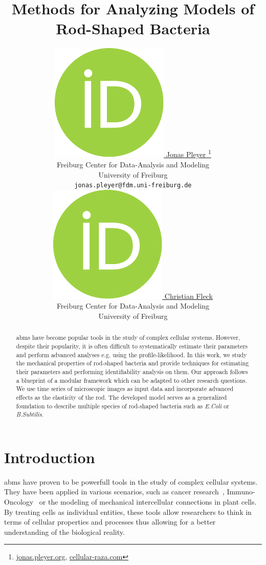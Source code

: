 \documentclass{article}
\title{Methods for Analyzing Models of\\ Rod-Shaped Bacteria}
\author{
    \href{https://orcid.org/0009-0001-0613-7978}{
        \includegraphics[scale=0.06]{figures/orcid.pdf}
        \hspace{1mm}Jonas Pleyer
    }
    \thanks{
        \href{https://jonas.pleyer.org}{jonas.pleyer.org},
        \href{https://cellular-raza.com}{cellular-raza.com}
    }\\
	Freiburg Center for Data-Analysis and Modeling\\
	University of Freiburg\\
	\texttt{jonas.pleyer@fdm.uni-freiburg.de} \\
	\And
	\href{https://orcid.org/0000-0002-6371-4495}{
        \includegraphics[scale=0.06]{figures/orcid.pdf}
        \hspace{1mm}Christian Fleck
    }\\
	Freiburg Center for Data-Analysis and Modeling\\
	University of Freiburg
}
\begin{document}
\maketitle


\begin{abstract}
    \aclp{abm} have become popular tools in the study of complex cellular systems.
    However, despite their popularity, it is often difficult to systematically estimate their
    parameters and perform advanced analyses e.g. using the profile-likelihood.
    In this work, we study the mechanical properties of rod-shaped bacteria and provide techniques
    for estimating their parameters and performing identifiability analysis on them.
    Our approach follows a blueprint of a modular framework which can be adapted to other research
    questions.
    We use time series of microscopic images as input data and incorporate advanced effects as the
    elasticity of the rod.
    The developed model serves as a generalized foundation to describe multiple species of
    rod-shaped bacteria such as \textit{E.Coli} or \textit{B.Subtilis}.
\end{abstract}


\pagebreak
\renewcommand{\contentsname}{Table of Contents (remove before submission)}
\tableofcontents
\pagebreak

\section{Introduction}

\acp{abm} have proven to be powerfull tools in the study of complex cellular systems.
They have been applied in various scenarios, such as cancer
research~\cite{Ghaffarizadeh2018,Cooper2020}, Immuno-Oncology~\cite{Karolak2021} or the modeling
of mechanical intercellular connections in plant cells.
By treating cells as individual entities, these tools allow researchers to think in terms of
cellular properties and processes thus allowing for a better understanding of the biological
reality.
\end{document}
